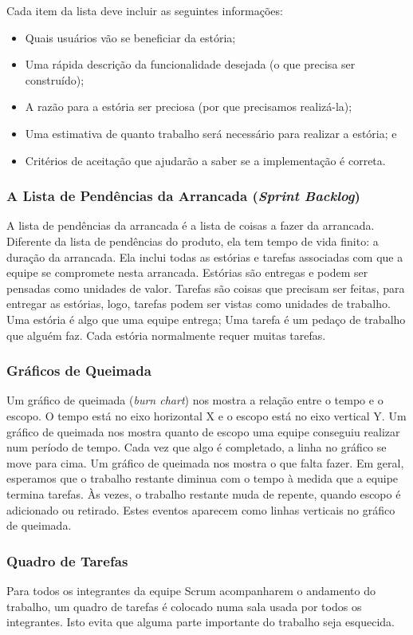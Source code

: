 \documentclass[
	11pt,				%
	openright,
	twoside,			%
	a4paper,			%
	english,			%
	french,
	brazil,				%
	sumario=tradicional
	]{abntex2}
\begin{document}
Cada item da lista deve incluir as seguintes informações:
\begin{itemize}
\item Quais usuários vão se beneficiar da estória;
\item Uma rápida descrição da funcionalidade desejada (o que precisa ser construído);
\item A razão para a estória ser preciosa (por que precisamos realizá-la);
\item Uma estimativa de quanto trabalho será necessário para realizar a estória; e
\item Critérios de aceitação que ajudarão a saber se a implementação é correta.
\end{itemize}

\subsubsection{A Lista de Pendências da Arrancada (\emph{Sprint Backlog})}
A lista de pendências da arrancada é a lista de coisas a fazer da arrancada. Diferente da lista de pendências do produto, ela tem tempo de vida finito: a duração da arrancada. Ela inclui todas as estórias e tarefas associadas com que a equipe se compromete nesta arrancada. Estórias são entregas e podem ser pensadas como unidades de valor. Tarefas são coisas que precisam ser feitas, para entregar as estórias, logo, tarefas podem ser vistas como unidades de trabalho. Uma estória é algo que uma equipe entrega; Uma tarefa é um pedaço de trabalho que alguém faz. Cada estória normalmente requer muitas tarefas.

\subsubsection{Gráficos de Queimada}
Um gráfico de queimada (\emph{burn chart}) nos mostra a relação entre o tempo e o escopo. O tempo está no eixo horizontal X e o escopo está no eixo vertical Y. Um gráfico de queimada nos mostra quanto de escopo uma equipe conseguiu realizar num período de tempo. Cada vez que algo é completado, a linha no gráfico se move para cima. Um gráfico de queimada nos mostra o que falta fazer. Em geral, esperamos que o trabalho restante diminua com o tempo à medida que a equipe termina tarefas. Às vezes, o trabalho restante muda de repente, quando escopo é adicionado ou retirado. Estes eventos aparecem como linhas verticais no gráfico de queimada.

\subsubsection{Quadro de Tarefas}
Para todos os integrantes da equipe Scrum acompanharem o andamento do trabalho, um quadro de tarefas é colocado numa sala usada por todos os integrantes. Isto evita que alguma parte importante do trabalho seja esquecida.
\end{document}
